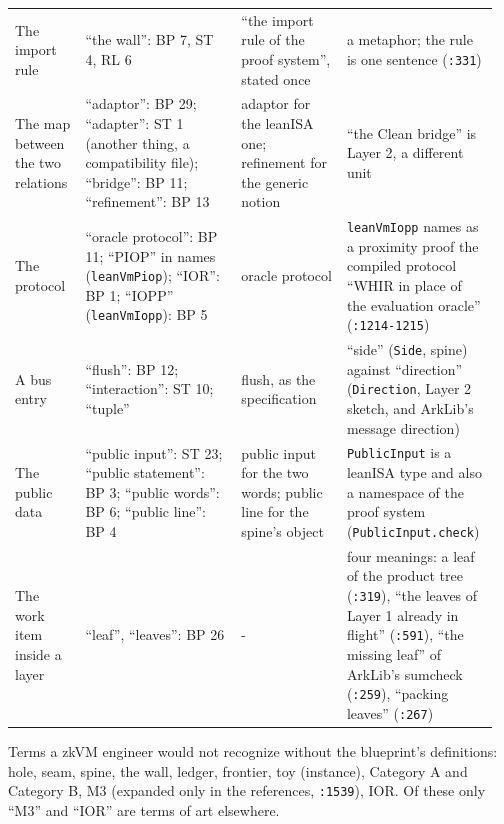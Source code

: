 {\begin{longtable}{@{}>{\raggedright\arraybackslash}p{0.143\linewidth}>{\raggedright\arraybackslash}p{0.316\linewidth}>{\raggedright\arraybackslash}p{0.210\linewidth}>{\raggedright\arraybackslash}p{0.287\linewidth}@{}}
The import rule & ``the wall'': BP 7, ST 4, RL 6 & ``the import rule of the proof system'', stated once & a metaphor; the rule is one sentence (\texttt{:\allowbreak{}331}) \\\addlinespace[2pt]
The map between the two relations & ``adaptor'': BP 29; ``adapter'': ST 1 (another thing, a compatibility file); ``bridge'': BP 11; ``refinement'': BP 13 & adaptor for the leanISA one; refinement for the generic notion & ``the Clean bridge'' is Layer 2, a different unit \\\addlinespace[2pt]
The protocol & ``oracle protocol'': BP 11; ``PIOP'' in names (\texttt{leanVmPiop}); ``IOR'': BP 1; ``IOPP'' (\texttt{leanVmIopp}): BP 5 & oracle protocol & \texttt{leanVmIopp} names as a proximity proof the compiled protocol ``WHIR in place of the evaluation oracle'' (\texttt{:\allowbreak{}1214-\allowbreak{}1215}) \\\addlinespace[2pt]
A bus entry & ``flush'': BP 12; ``interaction'': ST 10; ``tuple'' & flush, as the specification & ``side'' (\texttt{Side}, spine) against ``direction'' (\texttt{Direction}, Layer 2 sketch, and ArkLib's message direction) \\\addlinespace[2pt]
The public data & ``public input'': ST 23; ``public statement'': BP 3; ``public words'': BP 6; ``public line'': BP 4 & public input for the two words; public line for the spine's object & \texttt{PublicInput} is a leanISA type and also a namespace of the proof system (\texttt{Public\allowbreak{}Input.\allowbreak{}check}) \\\addlinespace[2pt]
The work item inside a layer & ``leaf'', ``leaves'': BP 26 & - & four meanings: a leaf of the product tree (\texttt{:\allowbreak{}319}), ``the leaves of Layer 1 already in flight'' (\texttt{:\allowbreak{}591}), ``the missing leaf'' of ArkLib's sumcheck (\texttt{:\allowbreak{}259}), ``packing leaves'' (\texttt{:\allowbreak{}267}) \\
\end{longtable}}

\begin{sloppypar}
Terms a zkVM engineer would not recognize without the blueprint's definitions: hole, seam, spine, the wall, ledger, frontier, toy (instance), Category A and Category B, M3 (expanded only in the references, \texttt{:\allowbreak{}1539}), IOR. Of these only ``M3'' and ``IOR'' are terms of art elsewhere.
\end{sloppypar}

